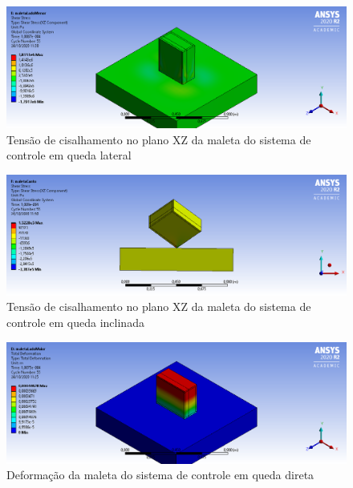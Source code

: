 \begin{apendicesenv}
\begin{figure}[htb]
    \centering
    \includegraphics[width=1.0\textwidth, angle=0]{figuras/estrutura_simulacaoImpacto/maletaCisalhamentoXZMenor.png}
    \caption{Tensão de cisalhamento no plano XZ da maleta do sistema de controle em queda lateral}
    \label{fig:simulacaoImpacto_23}
\end{figure}

\begin{figure}[htb]
    \centering
    \includegraphics[width=1.0\textwidth, angle=0]{figuras/estrutura_simulacaoImpacto/maletaCisalhamentoXZCanto.png}
    \caption{Tensão de cisalhamento no plano XZ da maleta do sistema de controle em queda inclinada}
    \label{fig:simulacaoImpacto_24}
\end{figure}

\begin{figure}[htb]
    \centering
    \includegraphics[width=1.0\textwidth, angle=0]{figuras/estrutura_simulacaoImpacto/maletaDeformacaoMaior.png}
    \caption{Deformação da maleta do sistema de controle em queda direta}
    \label{fig:simulacaoImpacto_25}
\end{figure}


\end{apendicesenv}
